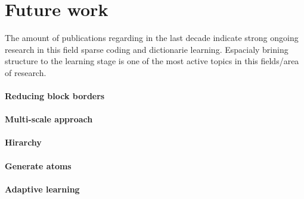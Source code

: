 \section{Future work}
The amount of publications regarding in
the last decade indicate strong ongoing research in this field sparse coding and
dictionarie learning. Espacialy brining structure to the learning stage is one
of the most active topics in this fields/area of research. 

\paragraph{Reducing block borders}
\paragraph{Multi-scale approach}
\paragraph{Hirarchy}
\paragraph{Generate atoms}
\paragraph{Adaptive learning}

